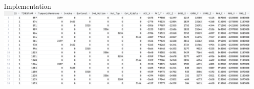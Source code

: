 \documentclass[en]{sdqbeamer}
\begin{document}
\begin{frame}{Implementation}
    \includegraphics[width=\linewidth]{../thesis-doc/images/prototype/MeasurementRawDataSnippet_short.png} %
\end{frame}

\backupend
\end{document}
